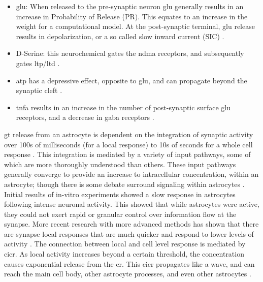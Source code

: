     \begin{itemize}
      \item \Gls{glu}: When released to the pre-synaptic neuron \gls{glu} generally
        results in an increase in Probability of Release (PR). This equates to
        an increase in the weight for a computational model. At the
        post-synaptic terminal, \gls{glu} release results in depolarization, or
        a so called slow inward current (SIC) \parencite{pitta_2016}.
      \item D-Serine: this neurochemical gates the \gls{ndma} receptors, and
        subsequently gates \gls{ltp}/\gls{ltd} \parencite{mederos_2018}.
      \item \Gls{atp} has a depressive effect, opposite to \gls{glu}, and can
        propagate beyond the synaptic cleft \parencite{mederos_2018}.
      \item \Gls{tnfa} results in an increase in the number of post-synaptic
        surface \gls{glu} receptors, and a decrease in \gls{gaba} receptors
        \parencite{chung_2015}.
    \end{itemize}

    \Gls{gt} release from an astrocyte is dependent on the integration of
    synaptic activity over 100s of milliseconds (for a local response)
    \parencite{pitta_2016} to 10s of seconds for a whole cell response
    \parencite{mederos_2018}. This integration is mediated by a variety of input
    pathways, some of which are more thoroughly understood than others. These
    input pathways generally converge to provide an increase to intracellular
    \ca concentration, within an astrocyte; though there is some debate surround
    \ca signaling within astrocytes \parencite{mederos_2018}. Initial results of
    in-vitro experiments showed a slow \ca response in astrocytes following
    intense neuronal activity. This showed that while astrocytes were active,
    they could not exert rapid or granular control over information flow at the
    synapse. More recent research with more advanced methods has shown that
    there are synapse local \ca responses that are much quicker and respond to
    lower levels of activity \parencite{araque_2014}. The connection between local
    and cell level response is mediated by \gls{cicr}. As local activity
    increases beyond a certain threshold, the \ca concentration causes
    exponential \ca release from the \gls{er}. This \gls{cicr} propagates like a
    wave, and can reach the main cell body, other astrocyte processes, and even
    other astrocytes \parencite{manninen_2018}.

